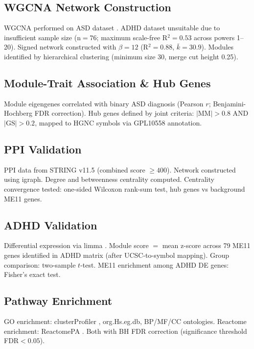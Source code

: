 \documentclass[10pt,twocolumn]{article}
\begin{document}
\subsection{WGCNA Network Construction}

WGCNA performed on ASD dataset \citep{langfelder2008}. ADHD dataset unsuitable due to
insufficient sample size (n$=76$; maximum scale-free R$^2=0.53$ across powers 1--20).
Signed network constructed with $\beta=12$ (R$^2=0.88$, $\bar{k}=30.9$). Modules identified
by hierarchical clustering (minimum size 30, merge cut height 0.25).

\subsection{Module-Trait Association \& Hub Genes}

Module eigengenes correlated with binary ASD diagnosis (Pearson $r$; Benjamini-Hochberg
FDR correction). Hub genes defined by joint criteria: $|\text{MM}|>0.8$ AND
$|\text{GS}|>0.2$, mapped to HGNC symbols via GPL10558 annotation.

\subsection{PPI Validation}

PPI data from STRING v11.5 \citep{szklarczyk2023} (combined score $\geq400$). Network
constructed using igraph. Degree and betweenness centrality computed. Centrality convergence
tested: one-sided Wilcoxon rank-sum test, hub genes vs background ME11 genes.

\subsection{ADHD Validation}

Differential expression via limma \citep{ritchie2015}. Module score $=$ mean z-score
across 79 ME11 genes identified in ADHD matrix (after UCSC-to-symbol mapping). Group
comparison: two-sample $t$-test. ME11 enrichment among ADHD DE genes: Fisher's exact test.

\subsection{Pathway Enrichment}

GO enrichment: clusterProfiler \citep{yu2012}, org.Hs.eg.db, BP/MF/CC ontologies.
Reactome enrichment: ReactomePA \citep{yu2016}. Both with BH FDR correction
(significance threshold FDR$<0.05$).
\end{document}
